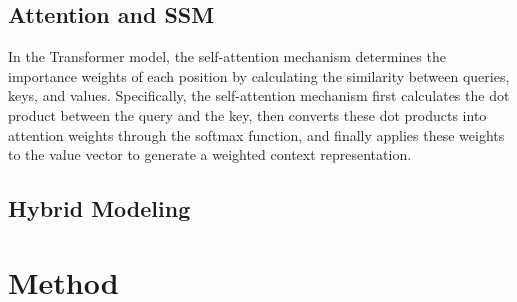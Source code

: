 \documentclass{article}
\theoremstyle{plain}
\theoremstyle{definition}
\theoremstyle{remark}
\begin{document}
\subsection{Attention and SSM}
In the Transformer model, the self-attention mechanism determines the importance weights of each position by calculating the similarity between queries, keys, and values. Specifically, the self-attention mechanism first calculates the dot product between the query and the key, then converts these dot products into attention weights through the softmax function, and finally applies these weights to the value vector to generate a weighted context representation.

\subsection{Hybrid Modeling}





\section{Method}
\end{document}

